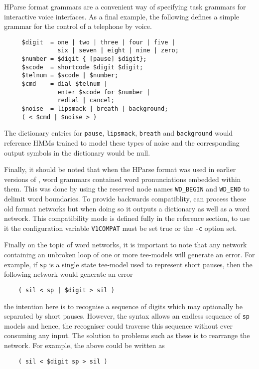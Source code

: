 HParse format grammars are a convenient way of specifying 
task grammars for interactive voice interfaces.  As a final
example, the following defines a simple grammar for the control
of a telephone by voice.
\begin{verbatim}
     $digit  = one | two | three | four | five |
               six | seven | eight | nine | zero;
     $number = $digit { [pause] $digit};
     $scode  = shortcode $digit $digit;
     $telnum = $scode | $number;
     $cmd    = dial $telnum | 
               enter $scode for $number |
               redial | cancel;
     $noise  = lipsmack | breath | background;
     ( < $cmd | $noise > )
\end{verbatim}
The dictionary entries for \texttt{pause}, \texttt{lipsmack}, 
\texttt{breath} and \texttt{background} would reference HMMs trained
to model these types of noise and the corresponding output symbols
in the dictionary would be null.

Finally, it should be noted that when the HParse 
format was used in
earlier versions of \HTK, word grammars contained word pronunciations
embedded within them.  This was done by using the reserved node names
\texttt{WD\_BEGIN} and \texttt{WD\_END} to delimit word boundaries. To
provide backwards compatiblity,  can process these old
format networks but when doing so it outputs a dictionary as well as a
word network.  This compatibility mode is defined fully in the
reference section, to use it the configuration variable
\texttt{V1COMPAT} must be set 
true or the \texttt{-c} option set.

Finally on the topic of word 
networks, it is important to note that
any network containing an unbroken loop of one or more tee-models
will generate an error.  
For example, if \texttt{sp} is a single state tee-model used to 
represent short pauses, then the following network would generate an
error
\begin{verbatim}
    ( sil < sp | $digit > sil )
\end{verbatim}
the intention here is to recognise a sequence of digits which may
optionally be separated by short pauses.  However, the syntax allows
an endless sequence of \texttt{sp} models and hence, the recogniser could
traverse this sequence without ever consuming any input.  The solution to
problems such as these is to rearrange the network.  For example, the
above could be written as
\begin{verbatim}
    ( sil < $digit sp > sil )
\end{verbatim}

